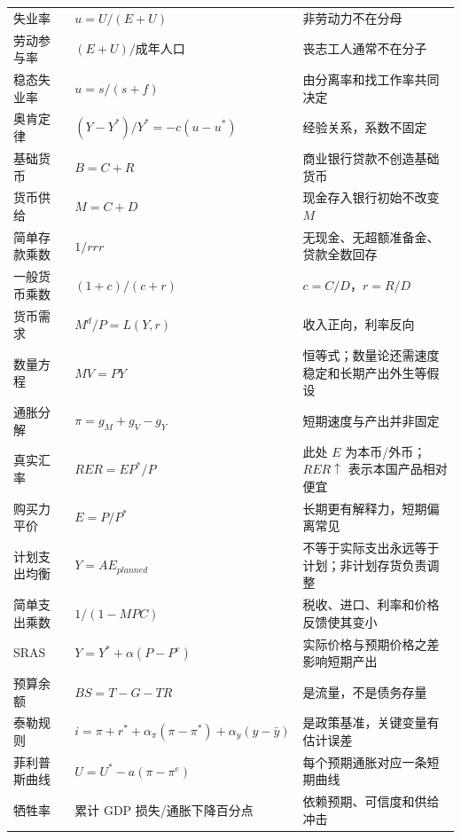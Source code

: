 \documentclass[UTF8,11pt,a4paper]{ctexart}
\begin{document}
\begin{longtable}{p{}p{}p{}}
失业率 & $u=U/(E+U)$ & 非劳动力不在分母\\
劳动参与率 & $(E+U)/\text{成年人口}$ & 丧志工人通常不在分子\\
稳态失业率 & $u=s/(s+f)$ & 由分离率和找工作率共同决定\\
奥肯定律 & $(Y-Y^*)/Y^*=-c(u-u^*)$ & 经验关系，系数不固定\\
基础货币 & $B=C+R$ & 商业银行贷款不创造基础货币\\
货币供给 & $M=C+D$ & 现金存入银行初始不改变 $M$\\
简单存款乘数 & $1/rrr$ & 无现金、无超额准备金、贷款全数回存\\
一般货币乘数 & $(1+c)/(c+r)$ & $c=C/D$，$r=R/D$\\
货币需求 & $M^d/P=L(Y,r)$ & 收入正向，利率反向\\
数量方程 & $MV=PY$ & 恒等式；数量论还需速度稳定和长期产出外生等假设\\
通胀分解 & $\pi=g_M+g_V-g_Y$ & 短期速度与产出并非固定\\
真实汇率 & $RER=EP^*/P$ & 此处 $E$ 为本币/外币；$RER\uparrow$ 表示本国产品相对便宜\\
购买力平价 & $E=P/P^*$ & 长期更有解释力，短期偏离常见\\
计划支出均衡 & $Y=AE_{planned}$ & 不等于实际支出永远等于计划；非计划存货负责调整\\
简单支出乘数 & $1/(1-MPC)$ & 税收、进口、利率和价格反馈使其变小\\
SRAS & $Y=Y^*+\alpha(P-P^e)$ & 实际价格与预期价格之差影响短期产出\\
预算余额 & $BS=T-G-TR$ & 是流量，不是债务存量\\
泰勒规则 & $i=\pi+r^*+\alpha_\pi(\pi-\pi^*)+\alpha_y(y-\bar y)$ & 是政策基准，关键变量有估计误差\\
菲利普斯曲线 & $U=U^*-a(\pi-\pi^e)$ & 每个预期通胀对应一条短期曲线\\
牺牲率 & 累计 GDP 损失/通胀下降百分点 & 依赖预期、可信度和供给冲击\\
\bottomrule
\end{longtable}
\end{document}

